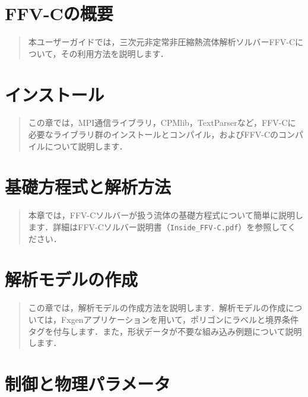 \documentclass[a4paper,10pt,oneside,fleqn]{jsbook}
\begin{document}
%

\tableofcontents
%
%
\mainmatter


\chapter{FFV-Cの概要}

{\begin{abstract}
本ユーザーガイドでは，三次元非定常非圧縮熱流体解析ソルバーFFV-Cについて，その利用方法を説明します．
\end{abstract}
%




\chapter{インストール}

\begin{abstract}
この章では，MPI通信ライブラリ，CPMlib，TextParserなど，FFV-Cに必要なライブラリ群のインストールとコンパイル，およびFFV-Cのコンパイルについて説明します．
\end{abstract}
%




\chapter{基礎方程式と解析方法}

\begin{abstract}
本章では，FFV-Cソルバーが扱う流体の基礎方程式について簡単に説明します．詳細はFFV-Cソルバー説明書（\verb|Inside_FFV-C.pdf|）を参照してください．
\end{abstract}
%




\chapter{解析モデルの作成}

\begin{abstract}
この章では，解析モデルの作成方法を説明します．解析モデルの作成については，Fxgenアプリケーションを用いて，ポリゴンにラベルと境界条件タグを付与します．また，形状データが不要な組み込み例題について説明します．
\end{abstract}
%




\chapter{制御と物理パラメータ}

}
\end{document}
